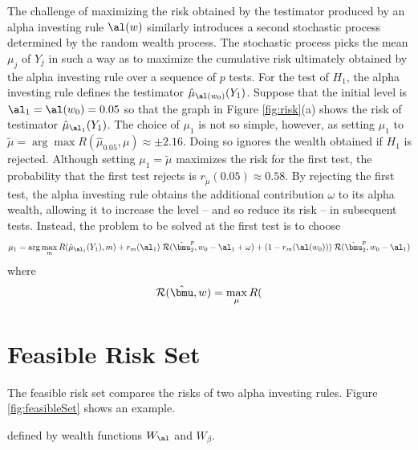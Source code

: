 \documentclass[12pt]{article}
\begin{document}
 The challenge of maximizing the risk obtained by the testimator produced by an
 alpha investing rule $\al(w)$ similarly introduces a second stochastic process
 determined by the random wealth process.  The stochastic process picks the mean
 $\mu_j$ of $Y_j$ in such a way as to maximize the cumulative risk ultimately
 obtained by the alpha investing rule over a sequence of $p$ tests.
  For the test of $H_1$, the alpha investing rule defines the testimator
 $\hat\mu_{\al(w_0)}(Y_1)$. Suppose that the initial level is $\al_1 =
 \al(w_0)=0.05$ so that the graph in Figure \ref{fig:risk}(a) shows the risk of
 testimator $\hat\mu_{\al_1}(Y_1)$.  The choice of $\mu_1$ is not so simple,
 however, as setting $\mu_1$ to $\tilde\mu = \arg \max R(\hat\mu_{0.05},\mu)
 \approx \pm 2.16$.  Doing so ignores the wealth obtained if $H_1$ is rejected.
   Although setting $\mu_1 = \tilde\mu$
 maximizes the risk for the first test, the probability that the first test
 rejects is $r_{\tilde\mu}(0.05) \approx 0.58$.  By rejecting the first test,
 the alpha investing rule obtains the additional contribution $\omega$ to its
 alpha wealth, allowing it to increase the level -- and so reduce its risk -- in
 subsequent tests.  Instead, the problem to be solved at the first test is to
 choose 
 \begin{displaymath}
    \mu_1 = \arg \max_{m} R(\hat\mu_{\al_1}(Y_1),m)
               + r_m(\al_1) \; {\cal R}(\hat{\bmu}_2^p, w_0-\al_1+\omega)
               + (1-r_m(\al(w_0))) \; {\cal R}(\hat{\bmu}_2^p, w_0-\al_1)
 \end{displaymath}
 where
 \begin{equation}
   {\cal R}(\hat{\bmu},w) = \max_\mu R(
 \label{eq:calR}
 \end{equation}
\section{ Feasible Risk Set }


 The feasible risk set compares the risks of two alpha investing rules.  Figure
\ref{fig:feasibleSet} shows an example.  


 defined
by wealth functions $W_\al$ and $W_\beta$.  
\end{document}
